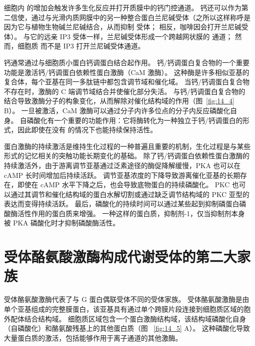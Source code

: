 细胞内  的增加会触发许多生化反应并打开质膜中的钙门控通道。
钙还可以作为第二信使，通过与光滑内质网膜中的另一种整合蛋白兰尼碱受体（之所以这样称呼是因为它与植物生物碱兰尼碱结合，从而抑制 受体；
相反，咖啡因会打开兰尼碱受体）。
与它的远亲 IP3 受体一样，兰尼碱受体形成一个跨越网状膜的  通道；
然而，细胞质  而不是 IP3 打开兰尼碱受体通道。


钙通常通过与细胞质小蛋白钙调蛋白结合起作用。
钙/钙调蛋白复合物的一个重要功能是激活钙/钙调蛋白依赖性蛋白激酶（CaM 激酶）。
这种酶是许多相似亚基的复合体，每个亚基在同一多肽链中都包含调节域和催化域。
当钙/钙调蛋白复合物不存在时，激酶的 C 端调节域结合并使催化部分失活。
与钙/钙调蛋白复合物的结合导致激酶分子的构象变化，从而解除对催化结构域的作用（图~\ref{fig:14_4} B）。
一旦被激活，CaM 激酶可以通过分子内许多位点的分子内反应磷酸化自身。
自磷酸化有一个重要的功能作用：它将酶转化为一种独立于钙/钙调蛋白的形式，因此即使在没有  的情况下也能持续保持活性。


蛋白激酶的持续激活是维持生化过程的一种普遍且重要的机制，生化过程是与某些形式的记忆相关的突触功能长期变化的基础。
除了钙/钙调蛋白依赖性蛋白激酶的持续激活外，由于游离调节亚基通过泛素途径的酶促降解缓慢，PKA 也可以在 cAMP 长时间增加后持续活跃。
调节亚基浓度的下降导致游离催化亚基的长期存在，即使在 cAMP 水平下降之后，也会导致底物蛋白的持续磷酸化。
PKC 也可以通过其调节和催化结构域的蛋白水解切割或通过缺乏调节结构域的 PKC 亚型的表达而变得持续活跃。
最后，磷酸化的持续时间可以通过某些起到抑制磷蛋白磷酸酶活性作用的蛋白质来增强。
一种这样的蛋白质，抑制剂-1，仅当抑制剂本身被 PKA 磷酸化时才抑制磷酸酶活性。



\section{受体酪氨酸激酶构成代谢受体的第二大家族}

受体酪氨酸激酶代表了与 G 蛋白偶联受体不同的受体家族。
受体酪氨酸激酶是由单个亚基组成的完整膜蛋白，该亚基具有通过单个跨膜片段连接到细胞质区域的胞外配体结合结构域。
细胞质区域包含一个蛋白激酶结构域，该结构域磷酸化自身（自磷酸化）和酪氨酸残基上的其他蛋白质（图 ~\ref{fig:14_5} A）。
这种磷酸化导致大量蛋白质的激活，包括能够作用于离子通道的其他激酶。


